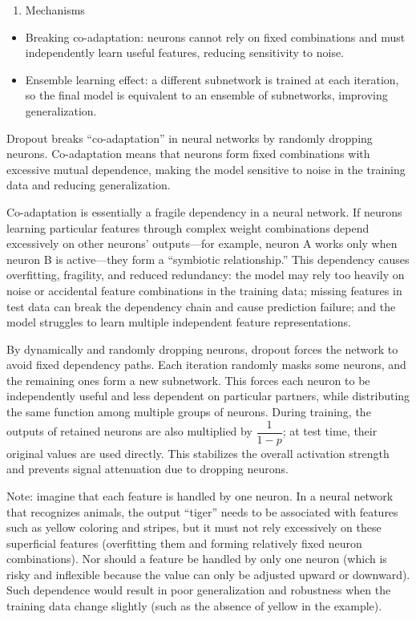 \begin{enumerate}
\def\labelenumi{\arabic{enumi}.}
\setcounter{enumi}{1}
\tightlist
\item
  Mechanisms
\end{enumerate}

\begin{itemize}
\tightlist
\item
  Breaking co-adaptation: neurons cannot rely on fixed combinations and must independently learn useful features, reducing sensitivity to noise.
\item
  Ensemble learning effect: a different subnetwork is trained at each iteration, so the final model is equivalent to an ensemble of subnetworks, improving generalization.
\end{itemize}

Dropout breaks ``co-adaptation'' in neural networks by randomly dropping neurons. Co-adaptation means that neurons form fixed combinations with excessive mutual dependence, making the model sensitive to noise in the training data and reducing generalization.

Co-adaptation is essentially a fragile dependency in a neural network. If neurons learning particular features through complex weight combinations depend excessively on other neurons' outputs---for example, neuron A works only when neuron B is active---they form a ``symbiotic relationship.'' This dependency causes overfitting, fragility, and reduced redundancy: the model may rely too heavily on noise or accidental feature combinations in the training data; missing features in test data can break the dependency chain and cause prediction failure; and the model struggles to learn multiple independent feature representations.

By dynamically and randomly dropping neurons, dropout forces the network to avoid fixed dependency paths. Each iteration randomly masks some neurons, and the remaining ones form a new subnetwork. This forces each neuron to be independently useful and less dependent on particular partners, while distributing the same function among multiple groups of neurons. During training, the outputs of retained neurons are also multiplied by \(\dfrac{1}{1-p}\); at test time, their original values are used directly. This stabilizes the overall activation strength and prevents signal attenuation due to dropping neurons.

Note: imagine that each feature is handled by one neuron. In a neural network that recognizes animals, the output ``tiger'' needs to be associated with features such as yellow coloring and stripes, but it must not rely excessively on these superficial features (overfitting them and forming relatively fixed neuron combinations). Nor should a feature be handled by only one neuron (which is risky and inflexible because the value can only be adjusted upward or downward). Such dependence would result in poor generalization and robustness when the training data change slightly (such as the absence of yellow in the example).

